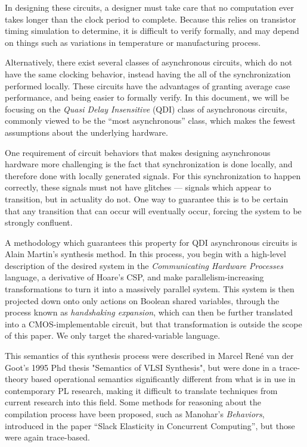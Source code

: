 \documentclass[times, 10pt]{article}
\begin{document}
In designing these circuits, a designer must take care that no computation ever
takes longer than the clock period to complete. Because this relies on
transistor timing simulation to determine, it is difficult to verify formally,
and may depend on things such as variations in temperature or manufacturing
process.

Alternatively, there exist several classes of asynchronous circuits, which do
not have the same clocking behavior, instead having the all of the
synchronization performed locally. These circuits have the advantages of
granting average case performance, and being easier to formally verify. In this
document, we will be focusing on the \emph{Quasi Delay Insensitive} (QDI) class
of asynchronous circuits, commonly viewed to be the ``most asynchronous'' class,
which makes the fewest assumptions about the underlying hardware.

One requirement of circuit behaviors that makes designing asynchronous hardware
more challenging is the fact that synchronization is done locally, and therefore
done with locally generated signals. For this synchronization to happen
correctly, these signals must not have glitches --- signals which appear to
transition, but in actuality do not. One way to guarantee this is to be certain
that any transition that can occur will eventually occur, forcing the system to
be strongly confluent.

A methodology which guarantees this property for QDI asynchronous circuits is
Alain Martin's synthesis method.  In this process, you begin with a high-level
description of the desired system in the \emph{Communicating Hardware Processes}
language, a derivative of Hoare's CSP, and make parallelism-increasing
transformations to turn it into a massively parallel system. This system is then
projected down onto only actions on Boolean shared variables, through the
process known as \emph{handshaking expansion}, which can then be further
translated into a CMOS-implementable circuit, but that transformation is outside
the scope of this paper.  We only target the shared-variable language.

This semantics of this synthesis process were described in Marcel Ren\'{e} van der
Goot's 1995 Phd thesis "Semantics of VLSI Synthesis", but were done in a
trace-theory based operational semantics significantly different from what is in
use in contemporary PL research, making it difficult to translate techniques
from current research into this field. Some methods for reasoning about the
compilation process have been proposed, such as Manohar's \emph{Behaviors},
introduced in the paper ``Slack Elasticity in Concurrent Computing'', but those
were again trace-based.
\end{document}
